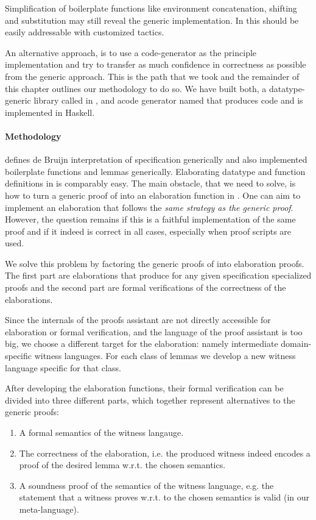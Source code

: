 Simplification of boilerplate functions like environment concatenation, shifting
and substitution may still reveal the generic implementation. In \Coq this
should be easily addressable with customized tactics.

An alternative approach, is to use a code-generator as the principle
implementation and try to transfer as much confidence in correctness as possible
from the generic approach. This is the path that we took and the remainder of
this chapter outlines our methodology to do so. We have built both, a
datatype-generic library called \Loom in \Coq, and acode generator named \Needle
that produces \Coq code and is implemented in Haskell.


\paragraph{Methodology}
\Loom defines de Bruijn interpretation of \Knot specification generically and
also implemented boilerplate functions and lemmas generically. Elaborating
datatype and function definitions in \Needle is comparably easy. The main
obstacle, that we need to solve, is how to turn a generic proof of \Loom into an
elaboration function in \Needle. One can aim to implement an elaboration that
follows the \emph{same strategy as the generic proof}. However, the question
remains if this is a faithful implementation of the same proof and if it indeed
is correct in all cases, especially when proof scripts are used.

We solve this problem by factoring the generic proofs of \Loom into elaboration
proofs. The first part are elaborations that produce for any given specification
specialized proofs and the second part are formal verifications of the
correctness of the elaborations.

Since the internals of the proofs assistant are not directly accessible for
elaboration or formal verification, and the language of the proof assistant is
too big, we choose a different target for the elaboration: namely intermediate
domain-specific witness languages. For each class of lemmas we develop a new
witness language specific for that class.

After developing the elaboration functions, their formal verification can be
divided into three different parts, which together represent alternatives to the
generic proofs:
\begin{enumerate}
\item A formal semantics of the witness langauge.
\item The correctness of the elaboration, i.e. the produced witness indeed
  encodes a proof of the desired lemma w.r.t. the chosen semantics.
\item A soundness proof of the semantics of the witness language, e.g. the
  statement that a witness proves w.r.t. to the chosen semantics is valid (in
  our meta-language).
\end{enumerate}

